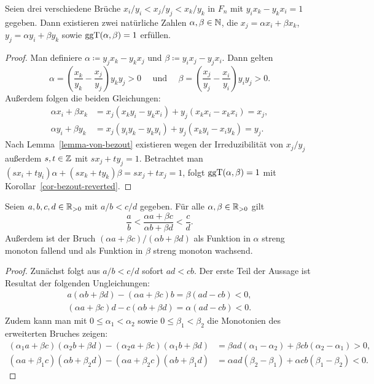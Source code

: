 \begin{lemma}\label{lemma-farey-middle-member}
	Seien drei verschiedene Brüche $x_i/y_i < x_j / y_j < x_k / y_k$ in $F_n$  mit $y_i x_k - y_k x_i = 1$ gegeben.
	Dann existieren zwei natürliche Zahlen $\alpha,\beta\in\mathbb{N}$, die $x_j = \alpha x_i + \beta x_k$, $y_j = \alpha y_i + \beta y_k$ sowie $\operatorname{ggT}(\alpha, \beta)=1$ erfüllen.
\end{lemma}
\begin{proof}
	Man definiere $\alpha\coloneq y_j x_k - y_k x_j$ und $\beta\coloneq y_i x_j - y_j x_i$.
	Dann gelten 
	\[
	\alpha = \left(\frac{x_k}{y_k} - \frac{x_j}{y_j}\right) y_k y_j > 0 \text{~~~ und ~~~} \beta = \left( \frac{x_j}{y_j} - \frac{x_i}{y_i} \right) y_i y_j > 0.
	\]
	Außerdem folgen die beiden Gleichungen:
	\begin{align*}
	\alpha x_i + \beta x_k &= x_j(x_k y_i - y_k x_i ) + y_j (x_k x_i - x_k x_i) = x_j, \\[1em]
	\alpha y_i + \beta y_k &= x_j (y_i y_k - y_k y_i) + y_j (x_k y_i - x_i y_k) = y_j.
	\end{align*}
	Nach Lemma~\ref{lemma-von-bezout} existieren wegen der Irreduzibilität von $x_j/y_j$ außerdem $s,t\in\mathbb{Z}$ mit $sx_j + ty_j = 1$.
	Betrachtet man $(sx_i + ty_i)\alpha + (sx_k + ty_k)\beta = s x_j + t x_j = 1$, folgt $\operatorname{ggT}(\alpha, \beta) = 1$ mit Korollar~\ref{cor-bezout-reverted}.
\end{proof}

\begin{lemma}\label{lemma-fraction-helpers}
	Seien $a,b,c,d\in\mathbb{R}_{>0}$ mit $a/b < c/d$ gegeben.
	Für alle $\alpha, \beta \in\mathbb{R}_{>0}$ gilt
	\[
		\frac{a}{b} < \frac{\alpha a + \beta c}{\alpha b + \beta d} < \frac{c}{d}.
	\]
	Außerdem ist der Bruch $(\alpha a + \beta c)/(\alpha b + \beta d)$ als Funktion in $\alpha$ streng monoton fallend und als Funktion in $\beta$ streng monoton wachsend.
\end{lemma}
\begin{proof}
	Zunächst folgt aus $a/b < c/d$ sofort $ad<cb$.
	Der erste Teil der Aussage ist Resultat der folgenden Ungleichungen:
	\begin{align*}
		a(\alpha b + \beta d) - (\alpha a + \beta c)b = \beta(ad - cb) < 0,\\[1em]
		(\alpha a + \beta c)d - c(\alpha b + \beta d) = \alpha(ad - cb) < 0.
	\end{align*}
	Zudem kann man mit $0\leq\alpha_1< \alpha_2$ sowie $0\leq\beta_1< \beta_2$ die Monotonien des erweiterten Bruches zeigen:
	\setlength{\belowdisplayskip}{0em}
	\begin{align*}
		(\alpha_1 a + \beta c)(\alpha_2 b + \beta d) - (\alpha_2a + \beta c)(\alpha_1 b + \beta d) &= \beta a d(\alpha_1 - \alpha_2) + \beta c b (\alpha_2 - \alpha_1) > 0, \\[1em]
		(\alpha a + \beta_1 c)(\alpha b + \beta_2 d) - (\alpha a + \beta_2c)(\alpha b + \beta_1 d) &= \alpha ad(\beta_2 - \beta_1) + \alpha cb(\beta_1 - \beta_2) < 0.
	\end{align*}
\end{proof}

